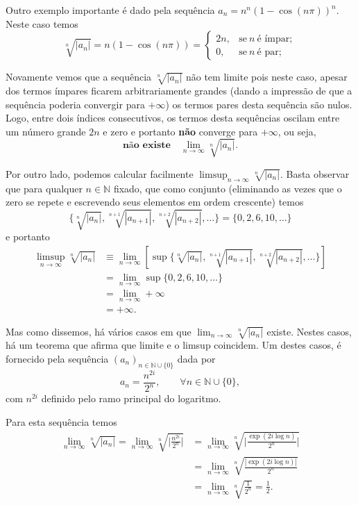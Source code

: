 Outro exemplo importante é dado pela sequência $a_n = n^n(1-\cos(n\pi))^n$.
Neste caso temos
\[
\sqrt[n]{|a_n|} = n(1-\cos(n\pi)) 
= 
\begin{cases}
2n,& \text{se}\ n \ \text{é ímpar}; 
\\
0,& \text{se}\ n \ \text{é par};  
\end{cases}
\]

Novamente vemos que a sequência $\sqrt[n]{|a_n|}$ não tem limite 
pois neste caso, apesar dos termos ímpares ficarem arbitrariamente 
grandes (dando a impressão de que a sequência poderia convergir para $+\infty$) 
os termos pares desta sequência são nulos. 
Logo, entre dois índices consecutivos, 
os termos desta sequências oscilam entre um número grande $2n$ e zero e portanto \textbf{não} converge para $+\infty$, ou seja,
\[
\textbf{não existe} \quad \lim_{n\to\infty}\sqrt[n]{|a_n|}.
\]

Por outro lado, podemos calcular facilmente 
$\limsup_{n\to\infty}\sqrt[n]{|a_n|}$.
Basta observar que para qualquer $n\in\mathbb{N}$ fixado, que como conjunto (eliminando as vezes que o zero se repete e escrevendo seus elementos em ordem crescente) temos
\[
\Big\{ \sqrt[n]{|a_n|}, \sqrt[n+1]{|a_{n+1}|}, \sqrt[n+2]{|a_{n+2}|},\ldots  \Big\}
=
\{0,2,6,10,\ldots\}
\]
e portanto 
\begin{align*}
\limsup_{n\to\infty} \sqrt[n]{|a_n|}
&\equiv 
\lim_{n\to\infty} \left[ \sup \Big\{ \sqrt[n]{|a_n|}, \sqrt[n+1]{|a_{n+1}|}, \sqrt[n+2]{|a_{n+2}|},\ldots  \Big\} \right]
\\
&=
\lim_{n\to\infty}\sup \{0,2,6,10,\ldots\}
\\
&=
\lim_{n\to\infty}+\infty
\\
&=
+\infty.
\end{align*}


Mas como dissemos, há vários casos em que 
$\lim_{n\to\infty} \sqrt[n]{|a_n|}$ existe. 
Nestes casos, há um teorema que afirma que limite e o limsup coincidem. 
Um destes casos, é fornecido pela sequência $(a_n)_{n\in\mathbb{N}\cup\{0\}}$
dada por
\[
a_n  = \frac{n^{2i}}{2^n}, \qquad \forall n\in\mathbb{N}\cup\{0\},
\]
com $n^{2i}$ definido pelo ramo principal do logaritmo.

Para esta sequência temos
\begin{align*}
\lim_{n\to\infty} \sqrt[n]{|a_n|}
=
\lim_{n\to\infty} \sqrt[n]{\Big|\frac{n^{2i}}{2^n}\Big|}
&=
\lim_{n\to\infty} \sqrt[n]{\Big|\frac{\exp(2i\log n)}{2^n}\Big|}
\\
&=
\lim_{n\to\infty} \sqrt[n]{\frac{|\exp(2i\log n)|}{2^n}}
\\
&=
\lim_{n\to\infty} \sqrt[n]{\frac{1}{2^n}}
=
\frac{1}{2}.
\end{align*}



